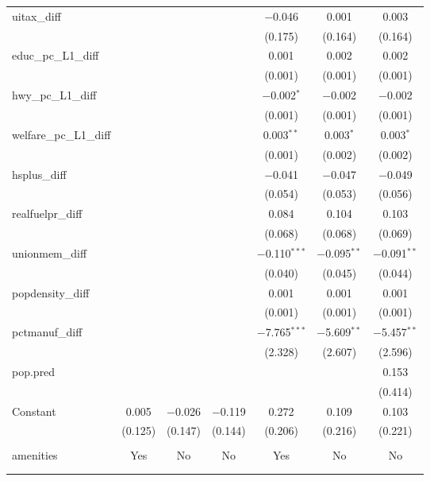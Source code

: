 \begin{table}[!htbp]
\begin{tabular}{@{\extracolsep{5pt}}lcccccc}
  uitax\_diff &  &  &  & $-$0.046 & 0.001 & 0.003 \\ 
  &  &  &  & (0.175) & (0.164) & (0.164) \\ 
  educ\_pc\_L1\_diff &  &  &  & 0.001 & 0.002 & 0.002 \\ 
  &  &  &  & (0.001) & (0.001) & (0.001) \\ 
  hwy\_pc\_L1\_diff &  &  &  & $-$0.002$^{*}$ & $-$0.002 & $-$0.002 \\ 
  &  &  &  & (0.001) & (0.001) & (0.001) \\ 
  welfare\_pc\_L1\_diff &  &  &  & 0.003$^{**}$ & 0.003$^{*}$ & 0.003$^{*}$ \\ 
  &  &  &  & (0.001) & (0.002) & (0.002) \\ 
  hsplus\_diff &  &  &  & $-$0.041 & $-$0.047 & $-$0.049 \\ 
  &  &  &  & (0.054) & (0.053) & (0.056) \\ 
  realfuelpr\_diff &  &  &  & 0.084 & 0.104 & 0.103 \\ 
  &  &  &  & (0.068) & (0.068) & (0.069) \\ 
  unionmem\_diff &  &  &  & $-$0.110$^{***}$ & $-$0.095$^{**}$ & $-$0.091$^{**}$ \\ 
  &  &  &  & (0.040) & (0.045) & (0.044) \\ 
  popdensity\_diff &  &  &  & 0.001 & 0.001 & 0.001 \\ 
  &  &  &  & (0.001) & (0.001) & (0.001) \\ 
  pctmanuf\_diff &  &  &  & $-$7.765$^{***}$ & $-$5.609$^{**}$ & $-$5.457$^{**}$ \\ 
  &  &  &  & (2.328) & (2.607) & (2.596) \\ 
  pop.pred &  &  &  &  &  & 0.153 \\ 
  &  &  &  &  &  & (0.414) \\ 
  Constant & 0.005 & $-$0.026 & $-$0.119 & 0.272 & 0.109 & 0.103 \\ 
  & (0.125) & (0.147) & (0.144) & (0.206) & (0.216) & (0.221) \\ 
 \hline \\[-1.8ex] 
amenities & Yes & No & No & Yes & No & No \\ 
\hline \\[-1.8ex] 
\hline 
\hline \\[-1.8ex] 
\end{tabular} 
\end{table} 
